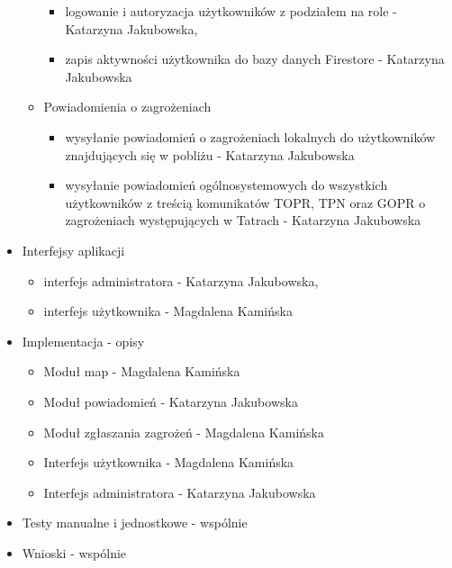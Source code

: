 \begin{itemize}
\begin{itemize}[label=$\circ$]
\begin{itemize}
                \item logowanie i autoryzacja użytkowników z podziałem na role - Katarzyna Jakubowska,
                \item zapis aktywności użytkownika do bazy danych Firestore - Katarzyna Jakubowska
            \end{itemize}
            \item Powiadomienia o zagrożeniach
            \begin{itemize}
                \item wysyłanie powiadomień o zagrożeniach lokalnych do użytkowników znajdujących się w pobliżu - Katarzyna Jakubowska
                \item wysyłanie powiadomień ogólnosystemowych do wszystkich użytkowników z treścią komunikatów TOPR, TPN oraz GOPR o zagrożeniach występujących w Tatrach - Katarzyna Jakubowska
            \end{itemize}
        \end{itemize}
        \item Interfejsy aplikacji
        \begin{itemize}[label=$\circ$]
            \item interfejs administratora - Katarzyna Jakubowska,
            \item interfejs użytkownika - Magdalena Kamińska
        \end{itemize}
        \item Implementacja - opisy
        \begin{itemize}
            \item Moduł map - Magdalena Kamińska
            \item Moduł powiadomień - Katarzyna Jakubowska
            \item Moduł zgłaszania zagrożeń - Magdalena Kamińska
            \item Interfejs użytkownika - Magdalena Kamińska
            \item Interfejs administratora - Katarzyna Jakubowska
        \end{itemize}
        \item Testy manualne i jednostkowe - wspólnie
        \item Wnioski - wspólnie
        \end{itemize}
   

    \newpage
